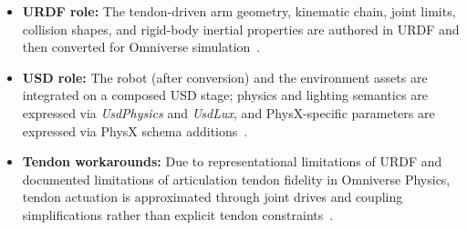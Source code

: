 \begin{itemize}
  \item \textbf{URDF role:} The tendon-driven arm geometry, kinematic chain, joint limits, collision shapes, and rigid-body inertial properties are authored in \ac{URDF} and then converted for Omniverse simulation~\cite{ros2_urdf_physical_properties,isaacsim_import_urdf_510}.
  \item \textbf{USD role:} The robot (after conversion) and the environment assets are integrated on a composed \ac{USD} stage; physics and lighting semantics are expressed via \emph{UsdPhysics} and \emph{UsdLux}, and PhysX-specific parameters are expressed via PhysX schema additions~\cite{openusd_usdphysics_schema,openusd_usdlux_schema,omni_physics_physx_joint_schema}.
  \item \textbf{Tendon workarounds:} Due to representational limitations of \ac{URDF} and documented limitations of articulation tendon fidelity in Omniverse Physics, tendon actuation is approximated through joint drives and coupling simplifications rather than explicit tendon constraints~\cite{ros2_control_joint_kinematics,omni_physics_current_limitations}.
\end{itemize}


